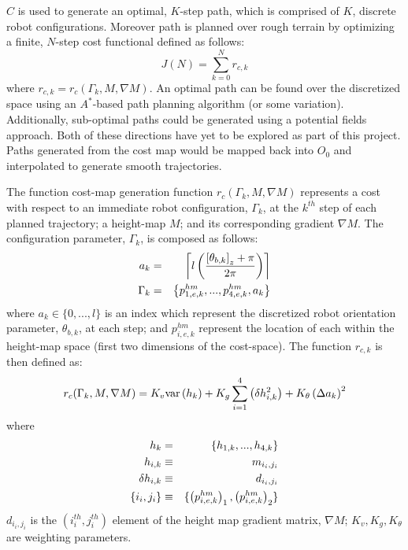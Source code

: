 			$C$ is used to generate an optimal, $K$-step path, which is comprised of $K$, discrete robot configurations. Moreover path is planned over rough terrain by optimizing a finite, $N$-step cost functional defined as follows:
				\begin{equation}			
					J(N) = \sum_{k=0}^N r_{c,k}
				\end{equation}	
			where  $r_{c,k} = r_{c}(\Gamma_{k},M,\nabla M)$. An optimal path can be found over the discretized space using an $A^{*}$-based path planning algorithm (or some variation). Additionally, sub-optimal paths could be generated using a potential fields approach. Both of these directions have yet to be explored as part of this project. Paths generated from the cost map would be mapped back into $O_{0}$ and interpolated to generate smooth trajectories.

			The function cost-map generation function $r_{c}(\Gamma_{k},M,\nabla M)$ represents a cost with respect to an immediate robot configuration, $\Gamma_{k}$, at the $k^{th}$ step of each planned trajectory; a height-map $M$; and its corresponding gradient $\nabla M$. The configuration parameter, $\Gamma_{k}$, is composed as follows:
				\begin{eqnarray}
					a_{k} 		&=& \left\lceil l\left(\frac{\left[\theta_{b,k}\right]_{z}+\pi}{2\pi}\right)\right\rceil \nonumber\\
					\Gamma_{k} 	&=& \left\{p_{1,e,k}^{hm},...,p_{4,e,k}^{hm},a_{k}\right\}
				\end{eqnarray}
			where $a_{k}\in\{0,...,l\}$ is an index which represent the discretized robot orientation parameter, $\theta_{b,k}$, at each \Kth step; and $p_{i,e,k}^{hm}$ represent the location of each \Ith within the height-map space (first two dimensions of the cost-space). The function $r_{c,k}$ is then defined as:
				\begin{equation}
					r_{c}(\Gamma_{k},M,\nabla M)
					= K_{v}\text{var}\left(h_{k}\right) 
					+ K_{g}\sum_{i=1}^{4}\left(\delta h_{i,k}^{2}\right) 
					+ K_{\theta}\left(\Delta a_{k}\right)^{2}
				\end{equation}
			where
				\begin{eqnarray*}
					h_{k} 			&=& \{h_{1,k},...,h_{4,k}\} \nonumber\\
					h_{i,k}			&\equiv& {m_{i_{i},j_{i}}}  \nonumber\\
					\delta h_{i,k}	&\equiv& {d_{i_{i},j_{i}}}  \nonumber\\
					\{i_{i},j_{i}\} &\equiv& \{ \left(p_{i,e,k}^{hm}\right)_{1}, \left(p_{i,e,k}^{hm}\right)_{2} \}
				\end{eqnarray*}
			$d_{i_{i},j_{i}}$ is the $(i_{i}^{th},j_{i}^{th})$ element of the height map gradient matrix, $\nabla M$; $K_{v},K_{g},K_{\theta}$ are weighting parameters.
			





